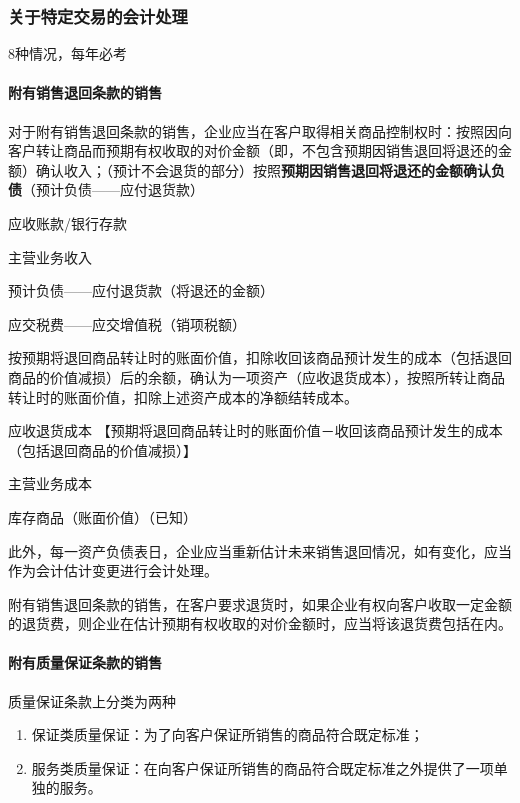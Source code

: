 \documentclass[UTF8,12pt]{ctexart}
\newenvironment{Dr}{%
	\begin{list}{}%
		{
			\setlength{\leftmargin}{2em}
			\setlength{\labelwidth}{2em}
			\setlength{\labelsep}{0pt}
			\setlength{\itemindent}{0pt}
			\setlength{\listparindent}{0pt}
			\setlength{\parsep}{0pt}
			\setlength{\topsep}{0pt}
		}
		\item[\textbf{借：}]
	}{%
	\end{list}
}
\newenvironment{Cr}{%
	\begin{list}{}%
		{
			\setlength{\leftmargin}{3em}
			\setlength{\labelwidth}{2em}
			\setlength{\labelsep}{0pt}
			\setlength{\itemindent}{0pt}
			\setlength{\listparindent}{0pt}
			\setlength{\parsep}{0pt}
			\setlength{\topsep}{0pt}
		}
		\item[\textbf{贷：}]
	}{%
	\end{list}
}
\numberwithin{equation}{section} %
\numberwithin{figure}{section}
\numberwithin{table}{section}
\begin{document}
	
	\subsubsection{关于特定交易的会计处理}
	8种情况，每年必考
	\paragraph{附有销售退回条款的销售}
	对于附有销售退回条款的销售，企业应当在客户取得相关商品控制权时：按照因向客户转让商品而预期有权收取的对价金额（即，不包含预期因销售退回将退还的金额）确认收入；（预计不会退货的部分）按照\textbf{预期因销售退回将退还的金额确认负债}（预计负债——应付退货款）
	\begin{Dr}
		应收账款/银行存款
	\end{Dr}
	\begin{Cr}
		主营业务收入
		
		预计负债——应付退货款（将退还的金额）
		
		应交税费——应交增值税（销项税额）
	\end{Cr}
	
	按预期将退回商品转让时的账面价值，扣除收回该商品预计发生的成本（包括退回商品的价值减损）后的余额，确认为一项资产（应收退货成本），按照所转让商品转让时的账面价值，扣除上述资产成本的净额结转成本。
	\begin{Dr}
		应收退货成本
		【预期将退回商品转让时的账面价值－收回该商品预计发生的成本（包括退回商品的价值减损）】
		
		主营业务成本
	\end{Dr}
	\begin{Cr}
		库存商品（账面价值）（已知）
	\end{Cr}
	
	此外，每一资产负债表日，企业应当重新估计未来销售退回情况，如有变化，应当作为会计估计变更进行会计处理。
		
	附有销售退回条款的销售，在客户要求退货时，如果企业有权向客户收取一定金额的退货费，则企业在估计预期有权收取的对价金额时，应当将该退货费包括在内。
	
	\paragraph{附有质量保证条款的销售}
	质量保证条款上分类为两种
	\begin{enumerate}
		\item 保证类质量保证：为了向客户保证所销售的商品符合既定标准；
		
		\item 服务类质量保证：在向客户保证所销售的商品符合既定标准之外提供了一项单独的服务。
	\end{enumerate}	
\end{document}
